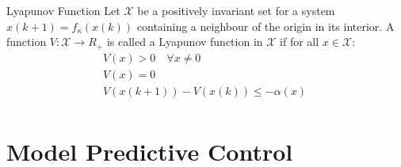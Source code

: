 \begin{definition}{Lyapunov Function}
	Let $\mathcal{X}$ be a positively invariant set for a system $x(k+1) = f_\kappa (x(k))$ containing a neighbour of the origin in its interior. A function $V : \mathcal{X} \rightarrow R_+$ is called a Lyapunov function in $\mathcal{X}$ if for all $x \in \mathcal{X}$:
	\begin{align*}
		&V(x) > 0 \quad \forall x \neq 0\\
		&V(x) = 0 \quad\\
		&V(x(k+1)) - V(x(k)) \leq -\alpha(x) \quad\\
	\end{align*}
	
	
\end{definition}




\section{Model Predictive Control}\label{sec:mpc_theory}


